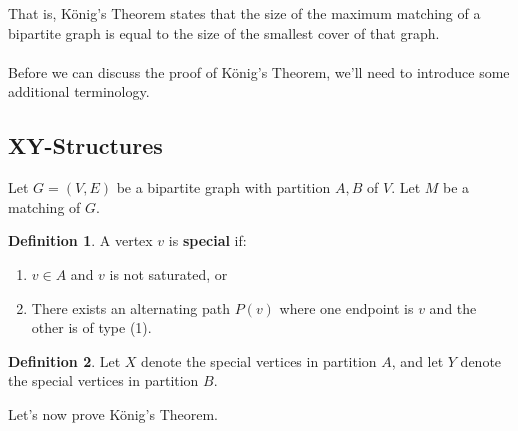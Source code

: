 \documentclass[]{article}
\theoremstyle{definition}
\newtheorem*{defn}{Definition}
\newcommand{\lecture}[1]{\marginpar{{\footnotesize $\leftarrow$ \underline{#1}}}}
\begin{document}
			That is, K\"onig's Theorem states that the size of the maximum matching of a bipartite graph is equal to the size of the smallest cover of that graph.
			\\ \\
			Before we can discuss the proof of K\"onig's Theorem, we'll need to introduce some additional terminology.
			
		\subsection{XY-Structures}
			Let $G = (V, E)$ be a bipartite graph with partition $A, B$ of $V$. Let $M$ be a matching of $G$.
			
			\begin{defn}
				A vertex $v$ is \textbf{special} if:
				\begin{enumerate}
					\item $v \in A$ and $v$ is not saturated, or
					\item There exists an alternating path $P(v)$ where one endpoint is $v$ and the other is of type (1).
				\end{enumerate}
			\end{defn}
			
			\begin{defn} \lecture{April 3, 2013}
				Let $X$ denote the special vertices in partition $A$, and let $Y$ denote the special vertices in partition $B$.
			\end{defn}
			
			Let's now prove K\"onig's Theorem.
			
\end{document}
